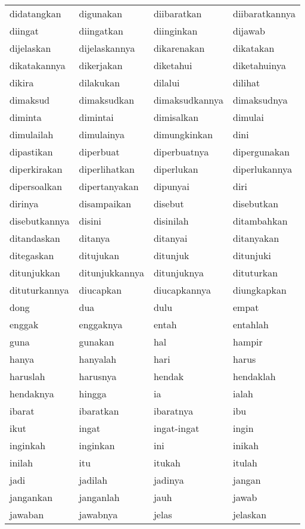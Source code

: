 \begin{tabular}{ | l | l | l | l | }
didatangkan & digunakan & diibaratkan & diibaratkannya\\
diingat & diingatkan & diinginkan & dijawab\\
dijelaskan & dijelaskannya & dikarenakan & dikatakan\\
dikatakannya & dikerjakan & diketahui & diketahuinya\\
dikira & dilakukan & dilalui & dilihat\\
dimaksud & dimaksudkan & dimaksudkannya & dimaksudnya\\
diminta & dimintai & dimisalkan & dimulai\\
dimulailah & dimulainya & dimungkinkan & dini\\
dipastikan & diperbuat & diperbuatnya & dipergunakan\\
diperkirakan & diperlihatkan & diperlukan & diperlukannya\\
dipersoalkan & dipertanyakan & dipunyai & diri\\
dirinya & disampaikan & disebut & disebutkan\\
disebutkannya & disini & disinilah & ditambahkan\\
ditandaskan & ditanya & ditanyai & ditanyakan\\
ditegaskan & ditujukan & ditunjuk & ditunjuki\\
ditunjukkan & ditunjukkannya & ditunjuknya & dituturkan\\
dituturkannya & diucapkan & diucapkannya & diungkapkan\\
dong & dua & dulu & empat\\
enggak & enggaknya & entah & entahlah\\
guna & gunakan & hal & hampir\\
hanya & hanyalah & hari & harus\\
haruslah & harusnya & hendak & hendaklah\\
hendaknya & hingga & ia & ialah\\
ibarat & ibaratkan & ibaratnya & ibu\\
ikut & ingat & ingat-ingat & ingin\\
inginkah & inginkan & ini & inikah\\
inilah & itu & itukah & itulah\\
jadi & jadilah & jadinya & jangan\\
jangankan & janganlah & jauh & jawab\\
jawaban & jawabnya & jelas & jelaskan\\

\end{tabular}
